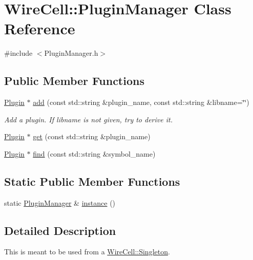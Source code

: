 \hypertarget{class_wire_cell_1_1_plugin_manager}{}\section{Wire\+Cell\+:\+:Plugin\+Manager Class Reference}
\label{class_wire_cell_1_1_plugin_manager}


{\ttfamily \#include $<$Plugin\+Manager.\+h$>$}

\subsection*{Public Member Functions}
\begin{DoxyCompactItemize}
\item 
\hyperlink{class_wire_cell_1_1_plugin}{Plugin} $\ast$ \hyperlink{class_wire_cell_1_1_plugin_manager_a91f5a66757079562b579ef7eae374c6d}{add} (const std\+::string \&plugin\+\_\+name, const std\+::string \&libname=\char`\"{}\char`\"{})
\begin{DoxyCompactList}\small\item\em Add a plugin. If libname is not given, try to derive it. \end{DoxyCompactList}\item 
\hyperlink{class_wire_cell_1_1_plugin}{Plugin} $\ast$ \hyperlink{class_wire_cell_1_1_plugin_manager_a0a1c54eebefd68844a29101629b70f6e}{get} (const std\+::string \&plugin\+\_\+name)
\item 
\hyperlink{class_wire_cell_1_1_plugin}{Plugin} $\ast$ \hyperlink{class_wire_cell_1_1_plugin_manager_ad83fad032405351bde15ad4abeeef819}{find} (const std\+::string \&symbol\+\_\+name)
\end{DoxyCompactItemize}
\subsection*{Static Public Member Functions}
\begin{DoxyCompactItemize}
\item 
static \hyperlink{class_wire_cell_1_1_plugin_manager}{Plugin\+Manager} \& \hyperlink{class_wire_cell_1_1_plugin_manager_aa1a081d67e99b8ef796b879e450fc8e0}{instance} ()
\end{DoxyCompactItemize}


\subsection{Detailed Description}
This is meant to be used from a \hyperlink{class_wire_cell_1_1_singleton}{Wire\+Cell\+::\+Singleton}. 

